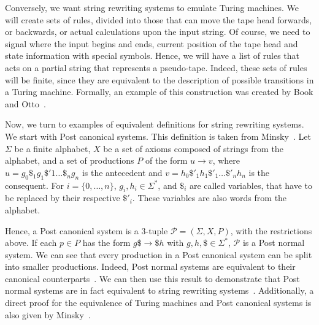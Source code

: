 \documentclass[12pt]{article}
\begin{document}
Conversely, we want string rewriting systems to emulate Turing machines. We will create sets of rules, divided into those that can move the tape head forwards, or backwards, or actual calculations upon the input string. Of course, we need to signal where the input begins and ends, current position of the tape head and state information with special symbols. Hence, we will have a list of rules that acts on a partial string that represents a pseudo-tape. Indeed, these sets of rules will be finite, since they are equivalent to the description of possible transitions in a Turing machine. Formally, an example of this construction was created by Book and Otto~\cite[Sec. 2.5]{Book:book:1993}.

Now, we turn to examples of equivalent definitions for string rewriting systems. We start with Post canonical systems. This definition is taken from Minsky~\cite[Sec. 12.5]{Minsky:book:1967}. Let $\Sigma$ be a finite alphabet, $X$ be a set of axioms composed of strings from the alphabet, and a set of productions $P$ of the form $u \rightarrow v$, where $u = g_{0}\$_{1}g_{1}\$'{1} \dots \$_{n}g_{n}$ is the antecedent and $v = h_{0}\$'_{1}h_{1}\$'_{1} \dots \$'_{n}h_{n}$ is the consequent. For $i = \{0, \dots, n\}$, $g_{i}, h_{i} \in \Sigma^{*}$, and $\$_{i}$ are called variables, that have to be replaced by their respective $\$'_{i}$. These variables are also words from the alphabet.

Hence, a Post canonical system is a $3$-tuple $\mathcal{P} = (\Sigma, X, P)$, with the restrictions above. If each $p \in P$ has the form $g\$ \rightarrow \$h$ with $g, h, \$ \in \Sigma^{*}$, $\mathcal{P}$ is a Post normal system. We can see that every production in a Post canonical system can be split into smaller productions. Indeed, Post normal systems are equivalent to their canonical counterparts~\cite[Theorem 13.1]{Minsky:book:1967}. We can then use this result to demonstrate that Post normal systems are in fact equivalent to string rewriting systems~\cite[Sec. 6.5, Theorem 5.1]{Davis:book:1958}. Additionally, a direct proof for the equivalence of Turing machines and Post canonical systems is also given by Minsky~\cite[Sec. 12.6]{Minsky:book:1967}.
\end{document}
